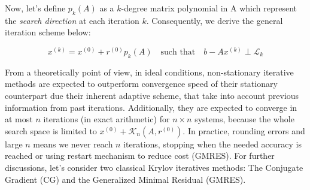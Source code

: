 Now, let's define $p_k(A)$ as a $k$-degree matrix polynomial in A which represent the \textit{search direction} at each iteration $k$. Consequently, we derive the general iteration scheme below:

\begin{equation}
    x^{(k)} = x^{(0)} + r^{(0)}p_k(A)\quad \text{such that}\quad b - Ax^{(k)} \perp \mathcal{L}_k
    \label{eq:nonStationaryMethodIteration}
\end{equation}

From a theoretically point of view, in ideal conditions, non-stationary iterative methods are expected to outperform convergence speed of their stationary counterpart due their inherent adaptive scheme, that take into account previous information from past iterations. Additionally, they are expected to converge in at most $n$ iterations (in exact arithmetic) for $n\times n$ systems, because the whole search space is limited to $x^{(0)} + \mathcal{K}_n(A, r^{(0)})$. In practice, rounding errors and large $n$ means we never reach $n$ iterations, stopping when the needed accuracy is reached or using restart mechanism to reduce cost (GMRES). For further discussions, let's consider two classical Krylov iteratives methods: The Conjugate Gradient (CG) and the Generalized Minimal Residual (GMRES).


